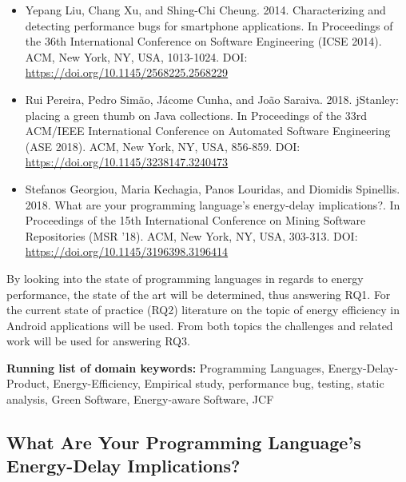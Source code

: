 \documentclass[]{book}
\begin{document}
\begin{itemize}
\item
  Yepang Liu, Chang Xu, and Shing-Chi Cheung. 2014. Characterizing and
  detecting performance bugs for smartphone applications. In Proceedings
  of the 36th International Conference on Software Engineering (ICSE
  2014). ACM, New York, NY, USA, 1013-1024. DOI:
  \url{https://doi.org/10.1145/2568225.2568229}
\item
  Rui Pereira, Pedro Simão, Jácome Cunha, and João Saraiva. 2018.
  jStanley: placing a green thumb on Java collections. In Proceedings of
  the 33rd ACM/IEEE International Conference on Automated Software
  Engineering (ASE 2018). ACM, New York, NY, USA, 856-859. DOI:
  \url{https://doi.org/10.1145/3238147.3240473}
\item
  Stefanos Georgiou, Maria Kechagia, Panos Louridas, and Diomidis
  Spinellis. 2018. What are your programming language's energy-delay
  implications?. In Proceedings of the 15th International Conference on
  Mining Software Repositories (MSR '18). ACM, New York, NY, USA,
  303-313. DOI: \url{https://doi.org/10.1145/3196398.3196414}
\end{itemize}

By looking into the state of programming languages in regards to energy
performance, the state of the art will be determined, thus answering
RQ1. For the current state of practice (RQ2) literature on the topic of
energy efficiency in Android applications will be used. From both topics
the challenges and related work will be used for answering RQ3.

\textbf{Running list of domain keywords:} Programming Languages,
Energy-Delay-Product, Energy-Efficiency, Empirical study, performance
bug, testing, static analysis, Green Software, Energy-aware Software,
JCF

\subsection{What Are Your Programming Language's Energy-Delay
Implications?}\label{what-are-your-programming-languages-energy-delay-implications}
\end{document}
